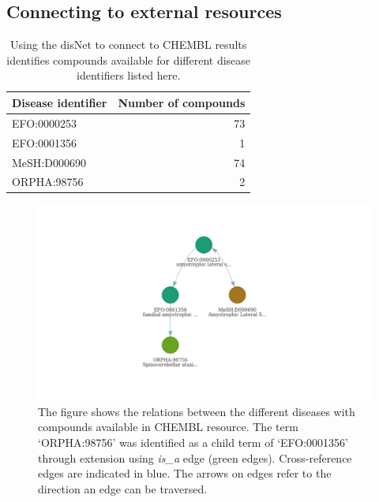 \documentclass[9pt,a4paper,]{extarticle}
\begin{document}
\hypertarget{connecting-to-external-resources}{%
\subsection{Connecting to external resources}\label{connecting-to-external-resources}}

\begin{table}

\caption{\label{tab:chemblDisNetind}Using the disNet to connect to CHEMBL results identifies compounds available for different disease identifiers listed here.}
\centering
\begin{tabular}[t]{l|r}
\hline
Disease identifier & Number of compounds\\
\hline
EFO:0000253 & 73\\
\hline
EFO:0001356 & 1\\
\hline
MeSH:D000690 & 74\\
\hline
ORPHA:98756 & 2\\
\hline
\end{tabular}
\end{table}



\begin{figure}

{\centering \includegraphics[width=1\linewidth]{DODO-F1000-publication_files/figure-latex/disnetALSchembl-1} 

}

\caption{The figure shows the relations between the different diseases with compounds available in CHEMBL resource. The term `ORPHA:98756' was identified as a child term of `EFO:0001356' through extension using \emph{is\_a} edge (green edges). Cross-reference edges are indicated in blue. The arrows on edges refer to the direction an edge can be traversed.}\label{fig:disnetALSchembl}
\end{figure}
\end{document}
